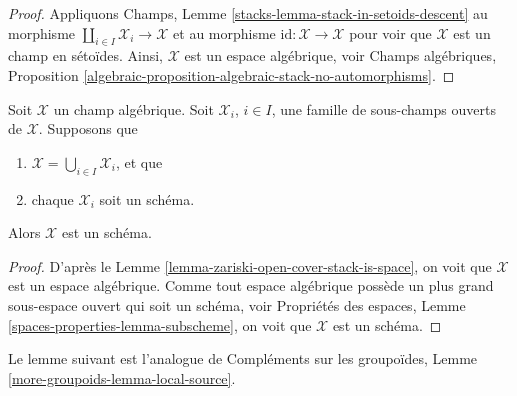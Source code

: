 \begin{proof}
Appliquons
Champs, Lemme \ref{stacks-lemma-stack-in-setoids-descent}
au morphisme $\coprod_{i \in I} \mathcal{X}_i \to \mathcal{X}$
et au morphisme $\text{id} : \mathcal{X} \to \mathcal{X}$ pour
voir que $\mathcal{X}$ est un champ en sétoïdes.
Ainsi, $\mathcal{X}$ est un espace algébrique, voir
Champs algébriques,
Proposition \ref{algebraic-proposition-algebraic-stack-no-automorphisms}.
\end{proof}

\begin{lemma}
\label{lemma-zariski-open-cover-stack-is-scheme}
Soit $\mathcal X$ un champ algébrique.
Soit $\mathcal{X}_i$, $i \in I$, une famille de sous-champs ouverts de $\mathcal{X}$.
Supposons que
\begin{enumerate}
\item $\mathcal{X} = \bigcup_{i \in I} \mathcal{X}_i$, et que
\item chaque $\mathcal{X}_i$ soit un schéma.
\end{enumerate}
Alors $\mathcal{X}$ est un schéma.
\end{lemma}

\begin{proof}
D'après le
Lemme \ref{lemma-zariski-open-cover-stack-is-space},
on voit que $\mathcal{X}$ est un espace algébrique. Comme tout espace
algébrique possède un plus grand sous-espace ouvert qui soit un schéma, voir
Propriétés des espaces, Lemme \ref{spaces-properties-lemma-subscheme},
on voit que $\mathcal{X}$ est un schéma.
\end{proof}


\noindent
Le lemme suivant est l'analogue de
Compléments sur les groupoïdes, Lemme \ref{more-groupoids-lemma-local-source}.

